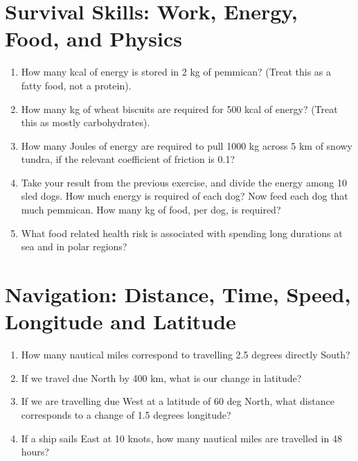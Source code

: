 \documentclass[10pt]{article}
\begin{document}
\section{Survival Skills: Work, Energy, Food, and Physics}

\begin{enumerate}
\item How many kcal of energy is stored in 2 kg of pemmican? (Treat this as a fatty food, not a protein). \\ \vspace{2cm}
\item How many kg of wheat biscuits are required for 500 kcal of energy? (Treat this as mostly carbohydrates). \\ \vspace{2cm}
\item How many Joules of energy are required to pull 1000 kg across 5 km of snowy tundra, if the relevant coefficient of friction is 0.1? \\ \vspace{2cm}
\item Take your result from the previous exercise, and divide the energy among 10 sled dogs.  How much energy is required of each dog?  Now feed each dog that much pemmican.  How many kg of food, per dog, is required? \\ \vspace{2cm}
\item What food related health risk is associated with spending long durations at sea and in polar regions? \\ \vspace{1cm}
\end{enumerate}

\section{Navigation: Distance, Time, Speed, Longitude and Latitude}

\begin{enumerate}
\item How many nautical miles correspond to travelling 2.5 degrees directly South? \\ \vspace{2cm}
\item If we travel due North by 400 km, what is our change in latitude? \\ \vspace{2cm}
\item If we are travelling due West at a latitude of 60 deg North, what distance corresponds to a change of 1.5 degrees longitude? \\ \vspace{2cm}
\item If a ship sails East at 10 knots, how many nautical miles are travelled in 48 hours? \\ \vspace{2cm}
\end{enumerate}
\end{document}
